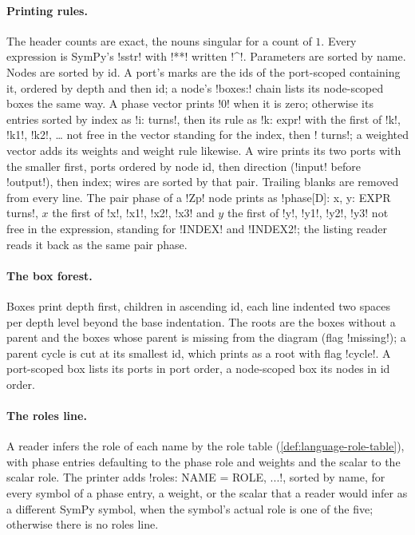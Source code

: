 \paragraph{Printing rules.} The header counts are exact, the nouns singular for a count of $1$. Every expression is SymPy's \py!sstr! with \code!**! written \code!^!. Parameters are sorted by name. Nodes are sorted by id. A port's marks are the ids of the port-scoped \bboxes{} containing it, ordered by depth and then id; a node's \code!boxes:! chain lists its node-scoped boxes the same way. A phase vector prints \code!0! when it is zero; otherwise its entries sorted by index as \code!i: turns!, then its rule as \code!k: expr! with the first of \code!k!, \code!k1!, \code!k2!, \ldots{} not free in the vector standing for the index, then \code! turns!; a weighted vector adds its weights and weight rule likewise. A wire prints its two ports with the smaller first, ports ordered by node id, then direction (\code!input! before \code!output!), then index; wires are sorted by that pair. Trailing blanks are removed from every line. The pair phase of a \code!Zp! node prints as \code!phase[D]: {x, y: EXPR} turns!, $x$ the first of \code!x!, \code!x1!, \code!x2!, \code!x3! and $y$ the first of \code!y!, \code!y1!, \code!y2!, \code!y3! not free in the expression, standing for \py!INDEX! and \py!INDEX2!; the listing reader reads it back as the same pair phase.

\paragraph{The box forest.} Boxes print depth first, children in ascending id, each line indented two spaces per depth level beyond the base indentation. The roots are the boxes without a parent and the boxes whose parent is missing from the diagram (flag \code!missing!); a parent cycle is cut at its smallest id, which prints as a root with flag \code!cycle!. A port-scoped box lists its ports in port order, a node-scoped box its nodes in id order.

\paragraph{The roles line.} A reader infers the role of each name by the role table (\cref{def:language-role-table}), with phase entries defaulting to the phase role and weights and the scalar to the scalar role. The printer adds \code!roles: NAME = ROLE, ...!, sorted by name, for every symbol of a phase entry, a weight, or the scalar that a reader would infer as a different SymPy symbol, when the symbol's actual role is one of the five; otherwise there is no roles line.

